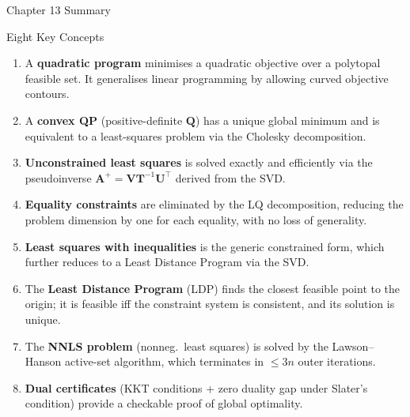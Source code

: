 \documentclass[aspectratio=169,10pt]{beamer}
\newcommand{\bA}{\mathbf{A}}
\newcommand{\bQ}{\mathbf{Q}}
\newcommand{\bU}{\mathbf{U}}
\newcommand{\bV}{\mathbf{V}}
\newcommand{\bT}{\mathbf{T}}
\begin{document}
\begin{frame}[allowframebreaks]{Chapter 13 Summary}
  \begin{block}{Eight Key Concepts}
    \begin{enumerate}
      \item A \textbf{quadratic program} minimises a quadratic objective over a polytopal feasible set.
            It generalises linear programming by allowing curved objective contours.
      \item A \textbf{convex QP} (positive-definite $\bQ$) has a unique global minimum and is
            equivalent to a least-squares problem via the Cholesky decomposition.
      \item \textbf{Unconstrained least squares} is solved exactly and efficiently via the
            pseudoinverse $\bA^+ = \bV\bT^{-1}\bU^{\top}$ derived from the SVD.
      \item \textbf{Equality constraints} are eliminated by the LQ decomposition, reducing the
            problem dimension by one for each equality, with no loss of generality.
      \item \textbf{Least squares with inequalities} is the generic constrained form, which
            further reduces to a Least Distance Program via the SVD.
      \item The \textbf{Least Distance Program} (LDP) finds the closest feasible point to the
            origin; it is feasible iff the constraint system is consistent, and its solution is unique.
      \item The \textbf{NNLS problem} (nonneg.\ least squares) is solved by the Lawson--Hanson
            active-set algorithm, which terminates in $\leq 3n$ outer iterations.
      \item \textbf{Dual certificates} (KKT conditions + zero duality gap under Slater's condition)
            provide a checkable proof of global optimality.
    \end{enumerate}
  \end{block}

\end{frame}
\end{document}
